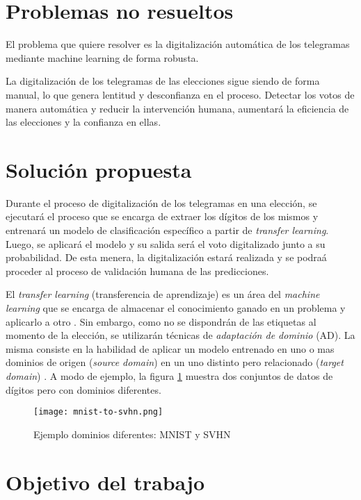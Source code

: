 \documentclass[a4paper, twoside]{report}
\begin{document}
\section*{Problemas no resueltos}

El problema que quiere resolver es la digitalizaci\'on autom\'atica de los telegramas mediante machine learning de
forma robusta.

La digitalizaci\'on de los telegramas de las elecciones sigue siendo de forma manual, lo que genera lentitud y
desconfianza en el proceso. Detectar los votos de manera autom\'atica y reducir la intervenci\'on humana, aumentar\'a
la eficiencia de las elecciones y la confianza en ellas.

\section*{Soluci\'on propuesta}

Durante el proceso de digitalizaci\'on de los telegramas en una elecci\'on, se ejecutar\'a el proceso que se encarga de
extraer los d\'igitos de los mismos y entrenar\'a un modelo de clasificaci\'on espec\'ifico a partir de {\it transfer
		learning}. Luego, se aplicar\'a el modelo y su salida ser\'a el voto digitalizado junto a su probabilidad. De esta
menera, la digitalizaci\'on estar\'a realizada y se podra\'a proceder al proceso de validaci\'on humana de las
predicciones.

El {\it transfer learning} (transferencia de aprendizaje) es un \'area del {\it machine learning} que se encarga de
almacenar el conocimiento ganado en un problema y aplicarlo a otro \cite{thrun1998learning}. Sin embargo, como no se
dispondr\'an de las etiquetas al momento de la elecci\'on, se utilizar\'an t\'ecnicas de {\it adaptaci\'on de dominio}
(AD). La misma consiste en la habilidad de aplicar un modelo entrenado en uno o mas dominios de origen ({\it source
		domain}) en un uno distinto pero relacionado ({\it target domain}) \cite{ben2006analysis}. A modo de ejemplo, la figura
\ref{fig:mnist-to-svhn} muestra dos conjuntos de datos de d\'igitos pero con dominios diferentes.

\begin{figure}[ht]
	\centering
	\texttt{[image: mnist-to-svhn.png]}
	\caption{Ejemplo dominios diferentes: MNIST y SVHN}
	\label{fig:mnist-to-svhn}
\end{figure}

\section*{Objetivo del trabajo}
\end{document}
